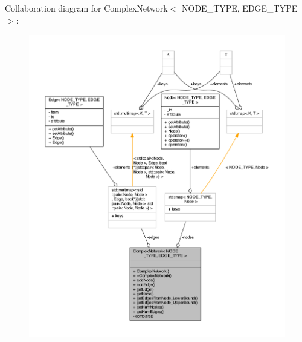 Collaboration diagram for Complex\+Network$<$ N\+O\+D\+E\+\_\+\+T\+Y\+P\+E, E\+D\+G\+E\+\_\+\+T\+Y\+P\+E $>$\+:\nopagebreak
\begin{figure}[H]
\begin{center}
\leavevmode
\includegraphics[width=350pt]{class_complex_network__coll__graph}
\end{center}
\end{figure}


